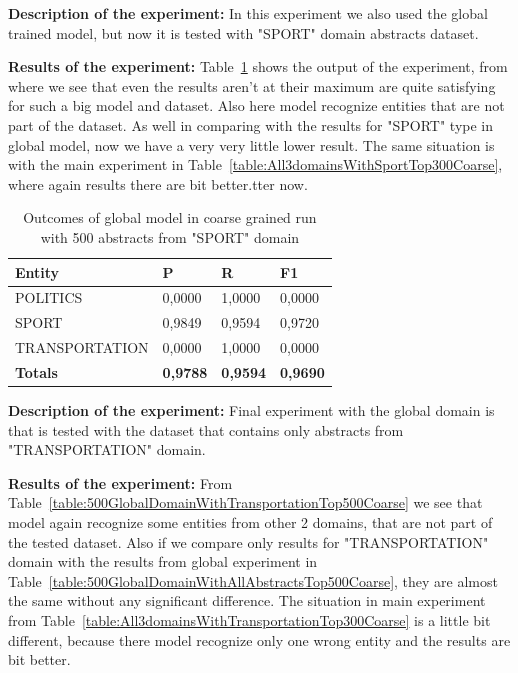 \documentclass[thesis=M,english]{FITthesis}[2018/05/30]
\begin{document}
\textbf{Description of the experiment:} In this experiment we also used the global trained model, but now it is tested with "SPORT" domain abstracts dataset.

	\textbf{Results of the experiment:} Table~\ref{table:500GlobalDomainWithSportTop500Coarse} shows the output of the experiment, from where we see that even the results aren't at their maximum are quite satisfying for such a big model and dataset. Also here model recognize entities that are not part of the dataset. As well in comparing with the results for "SPORT" type in global model, now we have a very very little lower result. The same situation is with the main experiment in Table~\ref{table:All3domainsWithSportTop300Coarse}, where again results there are bit better.tter now.

	\begin{table}[H]\centering
		\begin{tabular}{|l|l|l|l|}
			\hline {\textbf{Entity}} & {\textbf{P}} & {\textbf{R}} & {\textbf{F1}}\\\hline
				POLITICS & 0,0000 & 1,0000 & 0,0000\\
				SPORT & 0,9849 & 0,9594 & 0,9720\\
				TRANSPORTATION & 0,0000 & 1,0000 & 0,0000\\\hline
				\textbf{Totals} & \textbf{0,9788} & \textbf{0,9594} & \textbf{0,9690}\\\hline
		\end{tabular}
		\caption{Outcomes of global model in coarse grained run with 500 abstracts from "SPORT" domain \label{table:500GlobalDomainWithSportTop500Coarse}}
	\end{table}	

	\textbf{Description of the experiment:} Final experiment with the global domain is that is tested with the dataset that contains only abstracts from "TRANSPORTATION" domain.

	\textbf{Results of the experiment:} From Table~\ref{table:500GlobalDomainWithTransportationTop500Coarse} we see that model again recognize some entities from other 2 domains, that are not part of the tested dataset. Also if we compare only results for "TRANSPORTATION" domain with the results from global experiment in Table~\ref{table:500GlobalDomainWithAllAbstractsTop500Coarse}, they are almost the same without any significant difference. The situation in main experiment from Table~\ref{table:All3domainsWithTransportationTop300Coarse} is a little bit different, because there model recognize only one wrong entity and the results are bit better.
	
\end{document}
